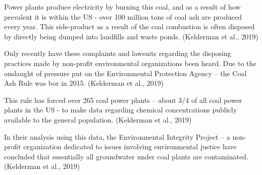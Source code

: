 \documentclass[12pt, twoside]{amherstthesis}
\begin{document}
Power plants produce electricity by burning this coal, and as a result of how prevalent it is within the US - over 100 million tons of coal ash are produced every year. This side-product as a result of the coal combustion is often disposed by directly being dumped into landfills and waste ponds. (Kelderman et al., 2019)

Only recently have these complaints and lawsuits regarding the disposing practices made by non-profit environmental organizations been heard. Due to the onslaught of pressure put on the Environmental Protection Agency -- the Coal Ash Rule was bor in 2015. (Kelderman et al., 2019)

This rule has forced over 265 coal power plants -- about 3/4 of all coal power plants in the US - to make data regarding chemical concentrations publicly available to the general population. (Kelderman et al., 2019)

In their analysis using this data, the Environmental Integrity Project -- a non-profit organization dedicated to issues involving environmental justice have concluded that essentially all groundwater under coal plants are contaminated. (Kelderman et al., 2019)
\end{document}

